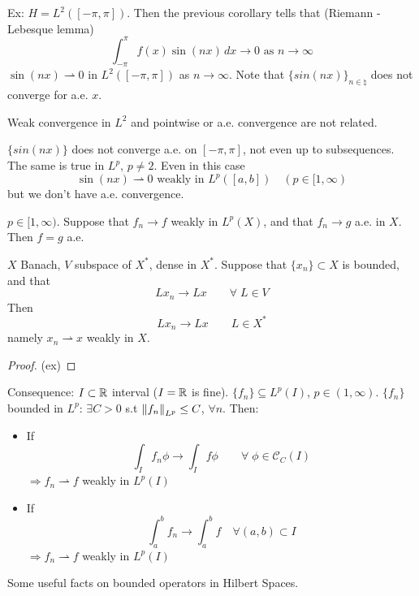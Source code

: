 Ex: \(H = L^2([-\pi, \pi])\). Then the previous corollary tells that (Riemann - Lebesque lemma)
\[
    \int_{-\pi}^\pi f(x) \sin (nx) \, dx \to 0 \text{ as } n \to \infty
\]                
\(\sin(nx) \rightharpoonup 0\) in \(L^2([-\pi, \pi])\) as \(n \to \infty\). Note that \(\{sin(nx)\}_{n \in \natural}\) does not converge for a.e. \(x\).

Weak convergence in \(L^2\) and pointwise or a.e. convergence are not related.

\(\{sin(nx)\}\) does not converge a.e. on \([-\pi, \pi]\), not even up to subsequences. 
The same is true in \(L^p\), \(p \neq 2\). Even in this case
\[
    \sin(nx) \rightharpoonup 0 \text{ weakly in } L^p([a,b]) \quad (p \in [1, \infty)
\] 
but we don't have a.e. convergence.

\begin{proposition}
    \(p \in [1, \infty)\). Suppose that \(f_n \to f\) weakly in \(L^p(X)\), and that \(f_n \to g\) a.e. in \(X\). Then \(f=g\) a.e.
\end{proposition}

\begin{proposition}
    \(X\) Banach, \(V\) subspace of \(X^*\), dense in \(X^*\). Suppose that \(\{x_n\} \subset X\) is bounded, and that 
    \[
        L x_n \to Lx \qquad \forall\; L \in V
    \]
    Then
    \[
        L x_n \to Lx \qquad L \in X^*
    \]
    namely \(x_n \rightharpoonup x\) weakly in \(X\).
\end{proposition}
\begin{proof}
    (ex)
\end{proof}

Consequence: \(I \subset \mathbb{R}\) interval (\(I= \mathbb{R}\) is fine). \(\{f_n\} \subseteq L^p(I)\), \(p \in (1, \infty)\). 
\(\{f_n\}\) bounded in \(L^p\): \(\exists C>0\) s.t \(\norm{f_n}_{L^p} \leq C\), \(\forall n\). Then:

\begin{itemize}
    \item If 
    \[
        \int_I f_n \phi \to \int_I f \phi \qquad \forall \; \phi \in \mathcal{C}_C(I)
    \]
    \(\Rightarrow f_n \rightharpoonup f\) weakly in \(L^p(I)\)
    \item If 
    \[
        \int_a^b f_n \to \int_a^b f \quad \forall (a, b) \subset I
    \]
    \(\Rightarrow f_n \rightharpoonup f\) weakly in \(L^p(I)\)
\end{itemize}

Some useful facts on bounded operators in Hilbert Spaces.

